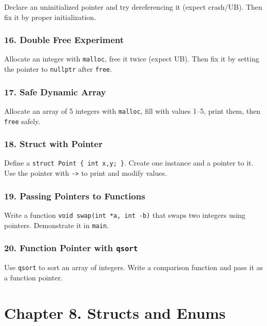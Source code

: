 \documentclass[
  letterpaper,
  DIV=11,
  numbers=noendperiod]{scrreprt}
\begin{document}
Declare an uninitialized pointer and try dereferencing it (expect
crash/UB). Then fix it by proper initialization.

\subsubsection{16. Double Free Experiment}\label{double-free-experiment}

Allocate an integer with \texttt{malloc}, free it twice (expect UB).
Then fix it by setting the pointer to \texttt{nullptr} after
\texttt{free}.

\subsubsection{17. Safe Dynamic Array}\label{safe-dynamic-array}

Allocate an array of 5 integers with \texttt{malloc}, fill with values
1--5, print them, then \texttt{free} safely.

\subsubsection{18. Struct with Pointer}\label{struct-with-pointer}

Define a \texttt{struct\ Point\ \{\ int\ x,y;\ \}}. Create one instance
and a pointer to it. Use the pointer with \texttt{-\textgreater{}} to
print and modify values.

\subsubsection{19. Passing Pointers to
Functions}\label{passing-pointers-to-functions}

Write a function \texttt{void\ swap(int\ *a,\ int\ -b)} that swaps two
integers using pointers. Demonstrate it in \texttt{main}.

\subsubsection{\texorpdfstring{20. Function Pointer with
\texttt{qsort}}{20. Function Pointer with qsort}}\label{function-pointer-with-qsort}

Use \texttt{qsort} to sort an array of integers. Write a comparison
function and pass it as a function pointer.

\section{Chapter 8. Structs and
Enums}\label{chapter-8.-structs-and-enums}
\end{document}
